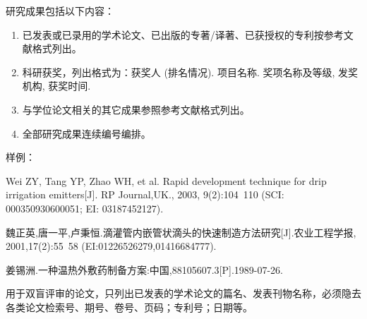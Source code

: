 

研究成果包括以下内容：
\begin{enumerate}
	\item 已发表或已录用的学术论文、已出版的专著/译著、已获授权的专利按参考文献格式列出。
	\item 科研获奖，列出格式为：获奖人 (排名情况). 项目名称. 奖项名称及等级, 发奖机构, 获奖时间.
	\item 与学位论文相关的其它成果参照参考文献格式列出。
	\item 全部研究成果连续编号编排。
\end{enumerate}
\vspace{36 pt}

样例：
\begin{publist}
	\item Wei ZY, Tang YP, Zhao WH, et al. Rapid development technique for drip irrigation emitters[J]. RP Journal,UK., 2003, 9(2):104~110 (SCI: 000350930600051; EI: 03187452127).
	\item 魏正英,唐一平,卢秉恒.滴灌管内嵌管状滴头的快速制造方法研究[J].农业工程学报, 2001,17(2):55~58 (EI:01226526279,01416684777).
	\item 姜锡洲.一种温热外敷药制备方案:中国,88105607.3[P].1989-07-26.
	\item 
\end{publist}

\vspace{\baselineskip}
{\color{red} 用于双盲评审的论文，只列出已发表的学术论文的篇名、发表刊物名称，必须隐去各类论文检索号、期号、卷号、页码；专利号；日期等。}

